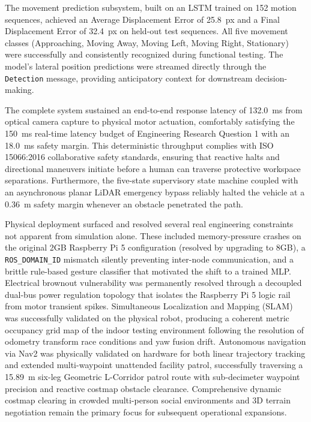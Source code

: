 The movement prediction subsystem, built on an LSTM trained on 152 motion sequences, achieved an Average Displacement Error of 25.8~px and a Final Displacement Error of 32.4~px on held-out test sequences. All five movement classes (Approaching, Moving Away, Moving Left, Moving Right, Stationary) were successfully and consistently recognized during functional testing. The model's lateral position predictions were streamed directly through the \texttt{Detection} message, providing anticipatory context for downstream decision-making.

The complete system sustained an end-to-end response latency of 132.0~ms from optical camera capture to physical motor actuation, comfortably satisfying the 150~ms real-time latency budget of Engineering Research Question 1 with an 18.0~ms safety margin. This deterministic throughput complies with ISO 15066:2016 collaborative safety standards, ensuring that reactive halts and directional maneuvers initiate before a human can traverse protective workspace separations. Furthermore, the five-state supervisory state machine coupled with an asynchronous planar LiDAR emergency bypass reliably halted the vehicle at a 0.36~m safety margin whenever an obstacle penetrated the path.

Physical deployment surfaced and resolved several real engineering constraints not apparent from simulation alone. These included memory-pressure crashes on the original 2GB Raspberry Pi 5 configuration (resolved by upgrading to 8GB), a \texttt{ROS\_DOMAIN\_ID} mismatch silently preventing inter-node communication, and a brittle rule-based gesture classifier that motivated the shift to a trained MLP. Electrical brownout vulnerability was permanently resolved through a decoupled dual-bus power regulation topology that isolates the Raspberry Pi 5 logic rail from motor transient spikes. Simultaneous Localization and Mapping (SLAM) was successfully validated on the physical robot, producing a coherent metric occupancy grid map of the indoor testing environment following the resolution of odometry transform race conditions and yaw fusion drift. Autonomous navigation via Nav2 was physically validated on hardware for both linear trajectory tracking and extended multi-waypoint unattended facility patrol, successfully traversing a 15.89~m six-leg Geometric L-Corridor patrol route with sub-decimeter waypoint precision and reactive costmap obstacle clearance. Comprehensive dynamic costmap clearing in crowded multi-person social environments and 3D terrain negotiation remain the primary focus for subsequent operational expansions.


